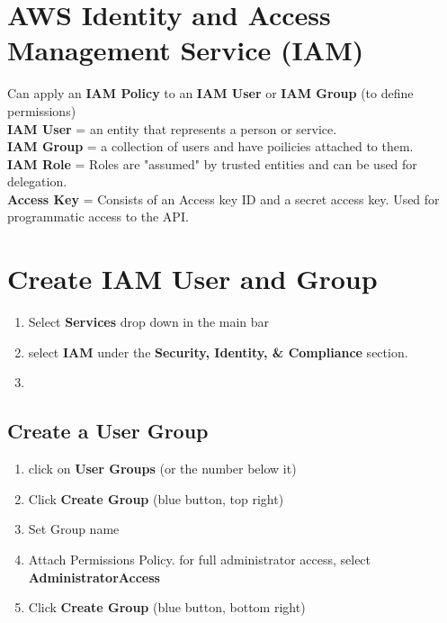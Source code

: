 \documentclass[11pt]{article}
\begin{document}
    \section{AWS Identity and Access Management Service (IAM)}
    Can apply an \textbf{IAM Policy} to an \textbf{IAM User} or \textbf{IAM Group} (to define permissions)
    \\
    \textbf{IAM User} = an entity that represents a person or service.
    \\
    \textbf{IAM Group} = a collection of users and have poilicies attached to them.
    \\
    \textbf{IAM Role} = Roles are "assumed" by trusted entities and can be used for delegation.
    \\
    \textbf{Access Key} = Consists of an Access key ID and a secret access key.
    Used for programmatic access to the API\@.

    \section{Create IAM User and Group}
    \begin{enumerate}
        \item Select \textbf{Services} drop down in the main bar
        \item select \textbf{IAM} under the \textbf{Security, Identity, \& Compliance} section.
        \item
    \end{enumerate}
    \subsection{Create a User Group}
    \begin{enumerate}
        \item click on \textbf{User Groups} (or the number below it)
        \item Click \textbf{Create Group}
        \subitem (blue button, top right)
        \item Set Group name
        \item Attach Permissions Policy.
        \subitem for full administrator access, select \textbf{AdministratorAccess}
        \item Click \textbf{Create Group}
        \subitem (blue button, bottom right)
    \end{enumerate}
\end{document}
